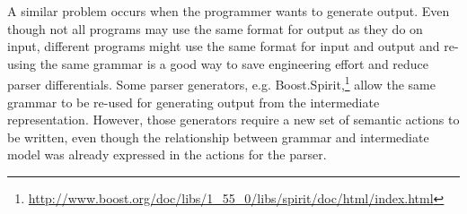A similar problem occurs when the programmer wants to generate output.
Even though not all programs may use the same format for output as they
do on input, different programs might use the same format for input and
output and re-using the same grammar is a good way to save engineering
effort and reduce parser differentials.  Some parser generators, e.g.
Boost.Spirit,\footnote{\url{http://www.boost.org/doc/libs/1_55_0/libs/spirit/doc/html/index.html}}
allow the same grammar to be re-used for generating output from the
intermediate representation.  However, those generators require a new set
of semantic actions to be written, even though the relationship between
grammar and intermediate model was already expressed in the actions for
the parser.

